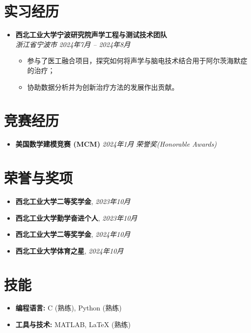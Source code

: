 \documentclass[a4paper,10pt]{article}
\begin{document}
\section*{实习经历}
\begin{itemize}[leftmargin=0.5cm]
	\item \textbf{西北工业大学宁波研究院声学工程与测试技术团队} \\ 
	\textit{浙江省宁波市} \hfill \textit{2024年7月 -- 2024年8月} 
	
	\begin{itemize}
		\item 参与了医工融合项目，探究如何将声学与脑电技术结合用于阿尔茨海默症的治疗；
		\item 协助数据分析并为创新治疗方法的发展作出贡献。
	\end{itemize}
\end{itemize}

\section*{竞赛经历}
\begin{itemize}[leftmargin=0.5cm]
    \item \textbf{美国数学建模竞赛 (MCM)} \hfill \textit{2024年1月} 
    \textit{荣誉奖(Honorable Awards)}
\end{itemize}

\section*{荣誉与奖项}
\begin{itemize}[leftmargin=0.5cm]
    \item \textbf{西北工业大学二等奖学金}, \hfill \textit{2023年10月} 
    \item \textbf{西北工业大学勤学奋进个人}, \hfill \textit{2023年10月} 
    \item \textbf{西北工业大学二等奖学金}, \hfill \textit{2024年10月}
    \item \textbf{西北工业大学体育之星}, \hfill \textit{2024年10月}
\end{itemize}

\section*{技能}
\begin{itemize}[leftmargin=0.5cm]
    \item \textbf{编程语言:} C (熟练), Python (熟练)
    \item \textbf{工具与技术:} MATLAB, LaTeX (熟练)
\end{itemize}
\end{document}
